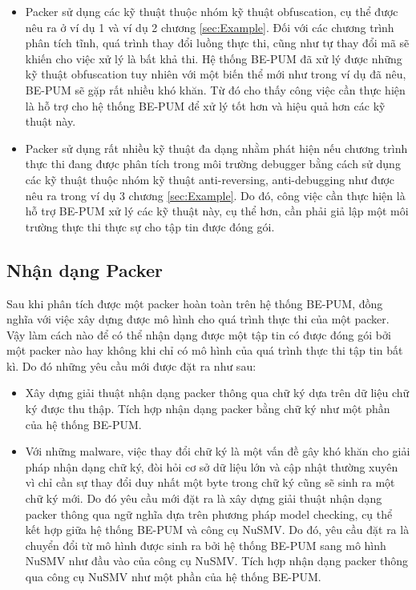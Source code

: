 \begin{itemize}
\item{Packer sử dụng các kỹ thuật thuộc nhóm kỹ thuật obfuscation, cụ thể được nêu ra ở ví dụ 1 và ví dụ 2 chương \ref {sec:Example}. Đối với các chương trình phân tích tĩnh, quá trình thay đổi luồng thực thi, cũng như tự thay đổi mã sẽ khiến cho việc xử lý là bất khả thi. Hệ thống BE-PUM đã xử lý được những kỹ thuật obfuscation tuy nhiên với một biến thể mới như trong ví dụ đã nêu, BE-PUM sẽ gặp rất nhiều khó khăn. Từ đó cho thấy công việc cần thực hiện là hỗ trợ cho hệ thống BE-PUM để xử lý tốt hơn và hiệu quả hơn các kỹ thuật này.\\}
\item{Packer sử dụng rất nhiều kỹ thuật đa dạng nhằm phát hiện nếu chương trình thực thi đang được phân tích trong môi trường debugger bằng cách sử dụng các kỹ thuật thuộc nhóm kỹ thuật anti-reversing, anti-debugging như được nêu ra trong ví dụ 3 chương \ref {sec:Example}. Do đó, công việc cần thực hiện là hỗ trợ BE-PUM xử lý các kỹ thuật này, cụ thể hơn, cần phải giả lập một môi trường thực thi thực sự cho tập tin được đóng gói.}
\end{itemize}

\subsection {Nhận dạng Packer}

\hspace{0.5cm}Sau khi phân tích được một packer hoàn toàn trên hệ thống BE-PUM, đồng nghĩa với việc xây dựng được mô hình cho quá trình thực thi của một packer. Vậy làm cách nào để có thể nhận dạng được một tập tin có được đóng gói bởi một packer nào hay không khi chỉ có mô hình của quá trình thực thi tập tin bất kì. Do đó những yêu cầu mới được đặt ra như sau:

\begin{itemize}
\item{Xây dựng giải thuật nhận dạng packer thông qua chữ ký dựa trên dữ liệu chữ ký được thu thập. Tích hợp nhận dạng packer bằng chữ ký như một phần của hệ thống BE-PUM.\\}
\item{Với những malware, việc thay đổi chữ ký là một vấn đề gây khó khăn cho giải pháp nhận dạng chữ ký, đòi hỏi cơ sở dữ liệu lớn và cập nhật thường xuyên vì chỉ cần sự thay đổi duy nhất một byte trong chữ ký cũng sẽ sinh ra một chữ ký mới. Do đó yêu cầu mới đặt ra là xây dựng giải thuật nhận dạng packer thông qua ngữ nghĩa dựa trên phương pháp model checking, cụ thể kết hợp giữa hệ thống BE-PUM và công cụ NuSMV. Do đó, yêu cầu đặt ra là chuyển đổi từ mô hình được sinh ra bởi hệ thống BE-PUM sang mô hình NuSMV như đầu vào của công cụ NuSMV. Tích hợp nhận dạng packer thông qua công cụ NuSMV như một phần của hệ thống BE-PUM.}
\end{itemize}

